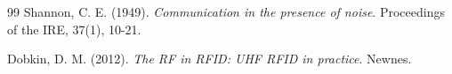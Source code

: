 \vspace{1cm}
\begin{thebibliography}{99}
Shannon, C. E. (1949). \textit{Communication in the presence of noise}. Proceedings of the IRE, 37(1), 10-21.

Dobkin, D. M. (2012). \textit{The RF in RFID: UHF RFID in practice}. Newnes.
\end{thebibliography}
